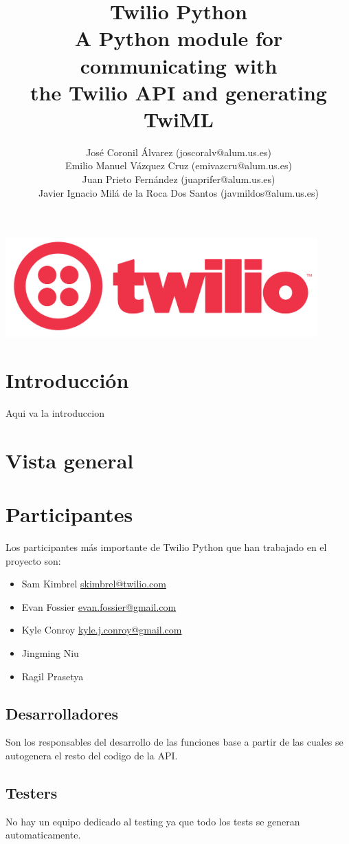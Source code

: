 \documentclass{article}
\title{%
  Twilio Python \\
  \large A Python module for communicating with \\
  the Twilio API and generating TwiML}
\author{José Coronil Álvarez (joscoralv@alum.us.es) \\
Emilio Manuel Vázquez Cruz (emivazcru@alum.us.es) \\
Juan Prieto Fernández (juaprifer@alum.us.es) \\
Javier Ignacio Milá de la Roca Dos Santos (javmildos@alum.us.es) \\}
\date{}
\begin{document}
\begin{titlepage}
  \centering
  \vfill
  {\bfseries\Large
      \thetitle
  }    
  \vfill
  \includegraphics[width=12cm]{logo.png} %
  \vfill
  \theauthor
\end{titlepage}



\section{Introducción}

Aqui va la introduccion

\section{Vista general}

\section{Participantes}
Los participantes más importante de Twilio Python que han trabajado en el proyecto son:
\begin{itemize}
  \item Sam Kimbrel \href{mailto:skimbrel@twilio.com}{skimbrel@twilio.com}
  \item Evan Fossier \href{mailto:evan.fossier@gmail.com}{evan.fossier@gmail.com}
  \item Kyle Conroy \href{mailto:kyle.j.conroy@gmail.com}{kyle.j.conroy@gmail.com}
  \item Jingming Niu 
  \item Ragil Prasetya 
  
  \end{itemize}
  
  \subsection*{Desarrolladores}
  Son los responsables del desarrollo de las funciones base a partir de las cuales se autogenera el resto del codigo de la API.
  \subsection*{Testers}
  No hay un equipo dedicado al testing ya que todo los tests se generan automaticamente.
\end{document}
